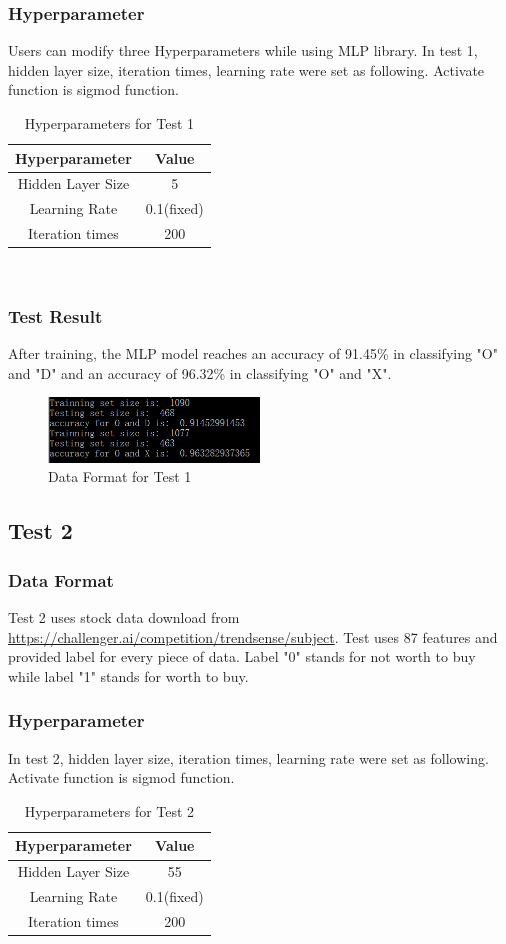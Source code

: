 \documentclass[a4paper]{article}
\begin{document}
\subsubsection{Hyperparameter}
Users can modify three Hyperparameters while using MLP library. In test 1, hidden layer size, iteration times, learning rate were set as following. Activate function is sigmod function.
\begin{table}[H]
\centering
\begin{tabular}{|c|c|}
 \hline
Hyperparameter& Value \\
 \hline
Hidden Layer Size & 5   \\
 \hline
Learning Rate& 0.1(fixed)\\
  \hline
Iteration times & 200\\
\hline
\end{tabular}\\
\caption{\label{tab:widgets}Hyperparameters for Test 1}
\end{table}
\subsubsection{Test Result}
After training, the MLP model reaches an accuracy of 91.45\% in classifying "O" and "D" and an accuracy of 96.32\% in classifying "O" and "X".
\begin{figure}[H]
\centering
\includegraphics[width=0.5\textwidth]{res1.png}
\caption{\label{fig:frog}Data Format for Test 1}
\end{figure}
\subsection{Test 2}
\subsubsection{Data Format}
Test 2 uses stock data download from \url{https://challenger.ai/competition/trendsense/subject}. Test uses 87 features and provided label for every piece of data. Label "0" stands for not worth to buy while label "1" stands for worth to buy.
\subsubsection{Hyperparameter}
In test 2, hidden layer size, iteration times, learning rate were set as following. Activate function is sigmod function.
\begin{table}[H]
\centering
\begin{tabular}{|c|c|}
 \hline
Hyperparameter& Value \\
 \hline
Hidden Layer Size & 55   \\
 \hline
Learning Rate& 0.1(fixed)\\
  \hline
Iteration times & 200\\
\hline
\end{tabular}\\
\caption{\label{tab:widgets}Hyperparameters for Test 2}
\end{table}
\end{document}
